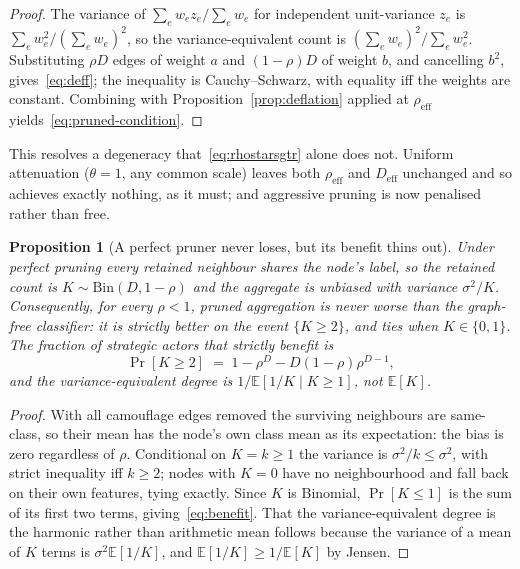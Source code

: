 \documentclass[onecolumn,pdflatex,sn-basic,Numbered]{sn-jnl}
\theoremstyle{thmstyleone}
\newtheorem{proposition}[theorem]{Proposition}
\theoremstyle{thmstylethree}
\begin{document}
\begin{proof}
The variance of $\sum_e w_e z_e / \sum_e w_e$ for independent unit-variance $z_e$ is
$\sum_e w_e^2/(\sum_e w_e)^2$, so the variance-equivalent count is
$(\sum_e w_e)^2/\sum_e w_e^2$. Substituting $\rho D$ edges of weight $a$ and
$(1-\rho)D$ of weight $b$, and cancelling $b^2$, gives~\eqref{eq:deff}; the
inequality is Cauchy--Schwarz, with equality iff the weights are constant.
Combining with Proposition~\ref{prop:deflation} applied at $\rho_{\mathrm{eff}}$
yields~\eqref{eq:pruned-condition}.
\end{proof}

This resolves a degeneracy that~\eqref{eq:rhostarsgtr} alone does not. Uniform
attenuation ($\theta = 1$, any common scale) leaves both $\rho_{\mathrm{eff}}$ and
$D_{\mathrm{eff}}$ unchanged and so achieves exactly nothing, as it must; and
aggressive pruning is now penalised rather than free.

\begin{proposition}[A perfect pruner never loses, but its benefit thins out]
\label{cor:ceiling}
Under perfect pruning every retained neighbour shares the node's label, so the
retained count is $K \sim \mathrm{Bin}(D, 1-\rho)$ and the aggregate is
\emph{unbiased} with variance $\sigma^2/K$. Consequently, for every $\rho<1$,
pruned aggregation is never worse than the graph-free classifier: it is strictly
better on the event $\{K\geq2\}$, and ties when $K\in\{0,1\}$. The fraction of \emph{strategic actors}
that strictly benefit is
\begin{equation}
    \Pr[K \geq 2] \;=\; 1 - \rho^{D} - D(1-\rho)\rho^{D-1},
    \label{eq:benefit}
\end{equation}
and the variance-equivalent degree is $1/\mathbb{E}[1/K \mid K\geq1]$, not
$\mathbb{E}[K]$.
\end{proposition}

\begin{proof}
With all camouflage edges removed the surviving neighbours are same-class, so their
mean has the node's own class mean as its expectation: the bias is zero regardless of
$\rho$. Conditional on $K=k\geq1$ the variance is $\sigma^2/k \leq \sigma^2$, with
strict inequality iff $k\geq2$; nodes with $K=0$ have no neighbourhood and fall back
on their own features, tying exactly. Since $K$ is Binomial, $\Pr[K\leq1]$ is the sum
of its first two terms, giving~\eqref{eq:benefit}. That the variance-equivalent
degree is the harmonic rather than arithmetic mean follows because the variance of a
mean of $K$ terms is $\sigma^2\mathbb{E}[1/K]$, and
$\mathbb{E}[1/K] \geq 1/\mathbb{E}[K]$ by Jensen.
\end{proof}
\end{document}

